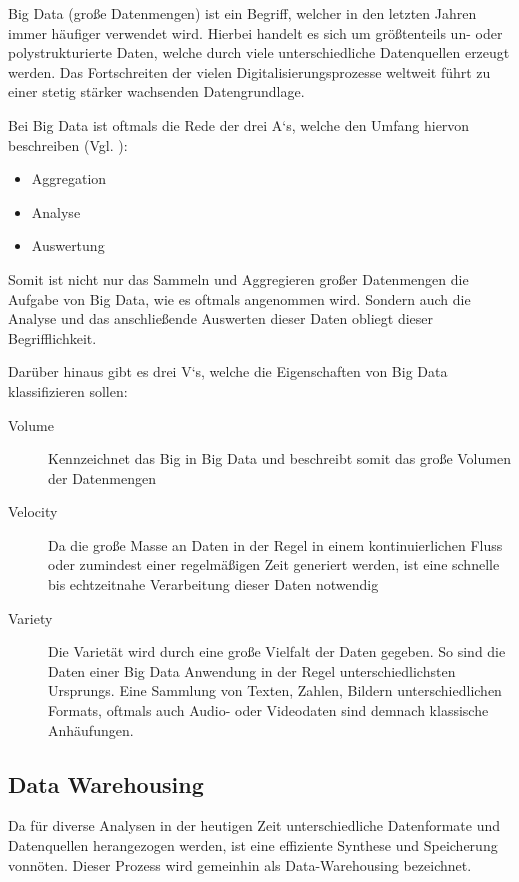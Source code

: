 Big Data (\glqq große Datenmengen\grqq) ist ein Begriff, welcher in den letzten Jahren immer häufiger verwendet wird.
Hierbei handelt es sich um größtenteils un- oder polystrukturierte Daten, welche durch viele unterschiedliche Datenquellen erzeugt werden.
Das Fortschreiten der vielen Digitalisierungsprozesse weltweit führt zu einer stetig stärker wachsenden Datengrundlage. 

Bei Big Data ist oftmals die Rede der drei A`s, welche den Umfang hiervon beschreiben (Vgl. \cite[2.1]{Hausler.2018}):
\begin{itemize}
\item Aggregation
\item Analyse
\item Auswertung
\end{itemize}
Somit ist nicht nur das Sammeln und Aggregieren großer Datenmengen die Aufgabe von Big Data, wie es oftmals angenommen wird.
Sondern auch die Analyse und das anschließende Auswerten dieser Daten obliegt dieser Begrifflichkeit.


Darüber hinaus gibt es drei V`s, welche die Eigenschaften von Big Data klassifizieren sollen:
\begin{description}
\item[Volume] Kennzeichnet das \glqq Big\grqq{} in Big Data und beschreibt somit das große Volumen der Datenmengen
\item[Velocity] Da die große Masse an Daten in der Regel in einem kontinuierlichen Fluss oder zumindest einer regelmäßigen Zeit generiert werden, ist eine schnelle bis echtzeitnahe Verarbeitung dieser Daten notwendig 
\item[Variety] Die Varietät wird durch eine große Vielfalt der Daten gegeben.
So sind die Daten einer Big Data Anwendung in der Regel unterschiedlichsten Ursprungs. 
Eine Sammlung von Texten, Zahlen, Bildern unterschiedlichen Formats, oftmals auch Audio- oder Videodaten sind demnach klassische Anhäufungen. 
\end{description}


\subsection{Data Warehousing}
\label{sub:warehouse}
Da für diverse Analysen in der heutigen Zeit unterschiedliche Datenformate und Datenquellen herangezogen werden, ist eine effiziente Synthese und Speicherung vonnöten.
Dieser Prozess wird gemeinhin als \glqq Data-Warehousing\grqq{} bezeichnet.

